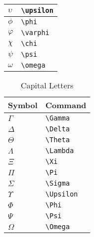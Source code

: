 \documentclass[10pt,a4paper]{article}
\begin{document}
\begin{table}[h]
\begin{tabular}{|l|l|}
\hline
$ \upsilon $ & \lstinline[language={[LaTeX]TeX}]|\upsilon| \\ 
\hline
$ \phi $ & \lstinline[language={[LaTeX]TeX}]|\phi| \\ 
\hline
$ \varphi $ & \lstinline[language={[LaTeX]TeX}]|\varphi| \\ 
\hline
$ \chi $ & \lstinline[language={[LaTeX]TeX}]|\chi| \\ 
\hline
$ \psi $ & \lstinline[language={[LaTeX]TeX}]|\psi| \\ 
\hline
$ \omega $ & \lstinline[language={[LaTeX]TeX}]|\omega| \\ 
\hline 
\end{tabular} 
\end{table}

\begin{table}[h]
\centering
\caption{Capital Letters} \label{table: Capital letters.}
\begin{tabular}{|l|l|}
\hline
Symbol & Command \\ 
\hline
$ \Gamma $ & \lstinline[language={[LaTeX]TeX}]|\Gamma| \\ 
\hline
$ \Delta $ & \lstinline[language={[LaTeX]TeX}]|\Delta| \\ 
\hline
$ \Theta $ & \lstinline[language={[LaTeX]TeX}]|\Theta| \\ 
\hline
$ \Lambda $ & \lstinline[language={[LaTeX]TeX}]|\Lambda| \\ 
\hline
$ \Xi $ & \lstinline[language={[LaTeX]TeX}]|\Xi| \\ 
\hline
$ \Pi $ & \lstinline[language={[LaTeX]TeX}]|\Pi| \\ 
\hline
$ \Sigma $ & \lstinline[language={[LaTeX]TeX}]|\Sigma| \\ 
\hline
$ \Upsilon $ & \lstinline[language={[LaTeX]TeX}]|\Upsilon| \\ 
\hline
$ \Phi $ & \lstinline[language={[LaTeX]TeX}]|\Phi| \\ 
\hline
$ \Psi $ & \lstinline[language={[LaTeX]TeX}]|\Psi| \\ 
\hline
$ \Omega $ & \lstinline[language={[LaTeX]TeX}]|\Omega| \\ 
\hline 
\end{tabular} 
\end{table}
\end{document}
